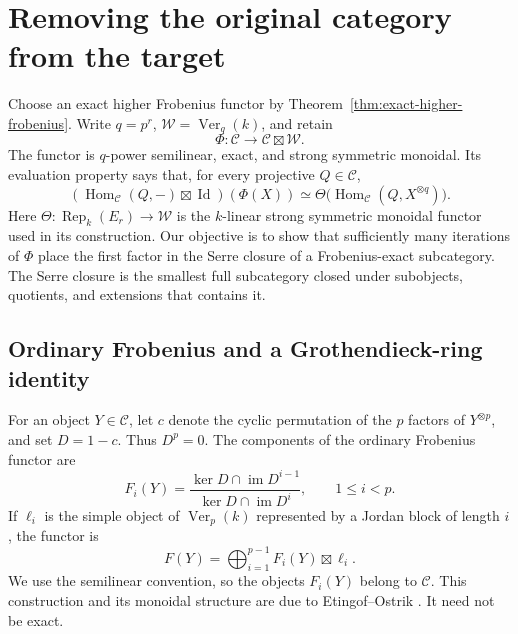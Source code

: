 \section{Removing the original category from the target}
\label{sec:dimension-descent}

Choose an exact higher Frobenius functor by
Theorem~\ref{thm:exact-higher-frobenius}. Write
\(q=p^r\), \(\mathcal W=\operatorname{Ver}_{q}(k)\), and retain
\[
 \Phi:\mathcal C\longrightarrow\mathcal C\boxtimes\mathcal W.
\]
The functor is \(q\)-power semilinear, exact, and strong symmetric monoidal.
Its evaluation property says that, for every projective \(Q\in\mathcal C\),
\begin{equation}\label{eq:descent-evaluation}
 (\operatorname{Hom}_{\mathcal C}(Q,-)\boxtimes\operatorname{Id})(\Phi(X))
 \simeq
 \Theta\bigl(\operatorname{Hom}_{\mathcal C}(Q,X^{\otimes q})\bigr).
\end{equation}
Here \(\Theta:\operatorname{Rep}_k(E_r)\to\mathcal W\) is the
\(k\)-linear strong symmetric monoidal functor used in its construction.
Our objective is to show that sufficiently many iterations of \(\Phi\)
place the first factor in the Serre closure of a Frobenius-exact subcategory.
The Serre closure is the smallest full subcategory closed under
subobjects, quotients, and extensions that contains it.

\subsection{Ordinary Frobenius and a Grothendieck-ring identity}

For an object \(Y\in\mathcal C\), let \(c\) denote the cyclic permutation of
the \(p\) factors of \(Y^{\otimes p}\), and set \(D=1-c\).  Thus \(D^p=0\).
The components of the ordinary Frobenius functor are
\[
 F_i(Y)=
 \frac{\ker D\cap\operatorname{im}D^{i-1}}
      {\ker D\cap\operatorname{im}D^i},
 \qquad 1\leq i<p.
\]
If \(\ell_i\) is the simple object of \(\operatorname{Ver}_p(k)\)
represented by a Jordan block of length \(i\), the functor is
\[
 F(Y)=\bigoplus_{i=1}^{p-1}F_i(Y)\boxtimes\ell_i.
\]
We use the semilinear convention, so the objects \(F_i(Y)\) belong to
\(\mathcal C\).  This construction and its monoidal structure are due to
Etingof--Ostrik \cite[Sections~3--5]{EtingofOstrikFrobenius}.
It need not be exact.

